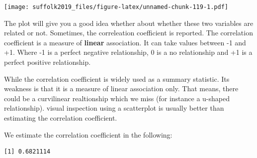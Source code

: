 \documentclass[]{article}
\newenvironment{Shaded}{\begin{snugshade}}{\end{snugshade}}
\newcommand{\DataTypeTok}[1]{\textcolor[rgb]{0.13,0.29,0.53}{#1}}
\newcommand{\KeywordTok}[1]{\textcolor[rgb]{0.13,0.29,0.53}{\textbf{#1}}}
\newcommand{\NormalTok}[1]{#1}
\newcommand{\OperatorTok}[1]{\textcolor[rgb]{0.81,0.36,0.00}{\textbf{#1}}}
\newcommand{\StringTok}[1]{\textcolor[rgb]{0.31,0.60,0.02}{#1}}
\begin{document}
\texttt{[image: suffolk2019\_files/figure-latex/unnamed-chunk-119-1.pdf]}

The plot will give you a good idea whether about whether these two variables are related or not. Sometimes, the correleation coefficient is reported. The correlation coefficient is a measure of \textbf{linear} association. It can take values between -1 and +1. Where -1 is a perfect negative relationship, 0 is a no relationship and +1 is a perfect positive relationship.

While the correlation coefficient is widely used as a summary statistic. Its weakness is that it is a measure of linear association only. That means, there could be a curvilinear realtionship which we miss (for instance a u-shaped relationship). visual inspection using a scatterplot is usually better than estimating the correlation coefficient.

We estimate the correlation coefficient in the following:

\begin{Shaded}
\end{Shaded}

\begin{verbatim}
[1] 0.6821114
\end{verbatim}
\end{document}
